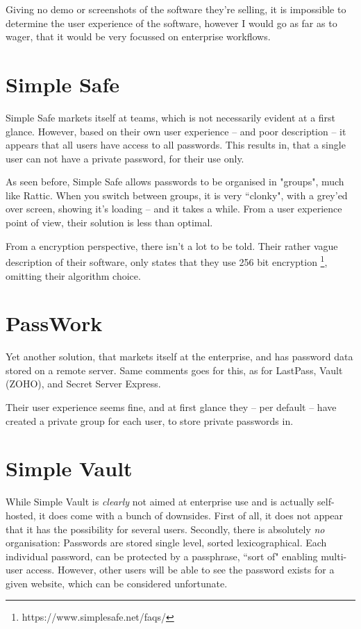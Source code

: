 \documentclass[a4paper,10pt]{article}
\begin{document}
	Giving no demo or screenshots of the software they're selling, it is impossible to determine the user experience of the software, however I would go as far as to wager, that it would be very focussed on enterprise workflows.

\section{Simple Safe}
	Simple Safe markets itself at teams, which is not necessarily evident at a first glance. However, based on their own user experience -- and poor description -- it appears that all users have access to all passwords. This results in, that a single user can not have a private password, for their use only.

	As seen before, Simple Safe allows passwords to be organised in "groups", much like Rattic. When you switch between groups, it is very ``clonky", with a grey'ed over screen, showing it's loading -- and it takes a while. From a user experience point of view, their solution is less than optimal.

	From a encryption perspective, there isn't a lot to be told. Their rather vague description of their software, only states that they use 256 bit encryption \footnote{https://www.simplesafe.net/faqs/}, omitting their algorithm choice.


\section{PassWork}
	Yet another solution, that markets itself at the enterprise, and has password data stored on a remote server. Same comments goes for this, as for LastPass, Vault (ZOHO), and Secret Server Express. 

	Their user experience seems fine, and at first glance they -- per default -- have created a private group for each user, to store private passwords in. 

\section{Simple Vault}
	While Simple Vault is \emph{clearly} not aimed at enterprise use and is actually self-hosted, it does come with a bunch of downsides. First of all, it does not appear that it has the possibility for several users. Secondly, there is absolutely \emph{no} organisation: Passwords are stored single level, sorted lexicographical. Each individual password, can be protected by a passphrase, ``sort of" enabling multi-user access. However, other users will be able to see the password exists for a given website, which can be considered unfortunate.
\end{document}
